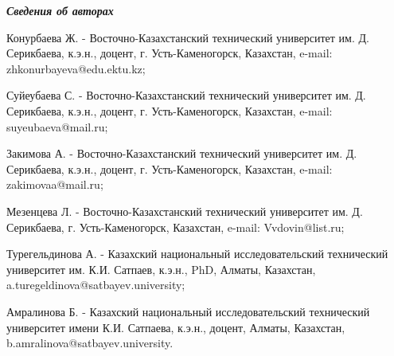 \emph{{\bfseries Сведения об авторах}}

\begin{noparindent}
Конурбаева Ж. - Восточно-Казахстанский технический университет им. Д.
Серикбаева, к.э.н., доцент, г. Усть-Каменогорск, Казахстан, e-mail:
zhkonurbayeva@edu.ektu.kz;

Суйеубаева С. - Восточно-Казахстанский технический университет им. Д.
Серикбаева, к.э.н., доцент, г. Усть-Каменогорск, Казахстан, e-mail:
suyeubaeva@mail.ru;

Закимова А. - Восточно-Казахстанский технический университет им. Д.
Серикбаева, к.э.н., доцент, г. Усть-Каменогорск, Казахстан, e-mail:
zakimovaa@mail.ru;

Мезенцева Л. - Восточно-Казахстанский технический университет им. Д.
Серикбаева, г. Усть-Каменогорск, Казахстан, e-mail: Vvdovin@list.ru;

Турегельдинова А. - Казахский национальный исследовательский технический
университет им. К.И. Сатпаев, к.э.н., PhD, Алматы, Казахстан,
a.turegeldinova@satbayev.university;

Амралинова Б. - Казахский национальный исследовательский технический
университет имени К.И. Сатпаева, к.э.н., доцент, Алматы, Казахстан,
b.amralinova@satbayev.university.
\end{noparindent}
